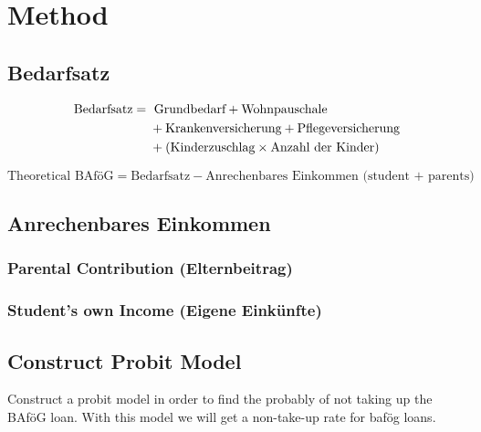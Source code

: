 \section{Method} 

\subsection{Bedarfsatz}
\begin{align}
  \text{Bedarfsatz} ={} &\ \text{Grundbedarf} + \text{Wohnpauschale} \notag \\
                         &+ \text{Krankenversicherung} + \text{Pflegeversicherung} \notag \\
                         &+ (\text{Kinderzuschlag} \times \text{Anzahl der Kinder})
\end{align}

\begin{equation}
  \text{Theoretical BAföG} = \text{Bedarfsatz} - \text{Anrechenbares Einkommen (student + parents)}
\end{equation}

\subsection{Anrechenbares Einkommen}
\subsubsection{Parental Contribution (Elternbeitrag)}
\subsubsection{Student's own Income (Eigene Einkünfte)}


\subsection{Construct Probit Model}
Construct a probit model in order to find the probably of not taking up the BAföG loan. 
With this model we will get a non-take-up rate for bafög loans.

